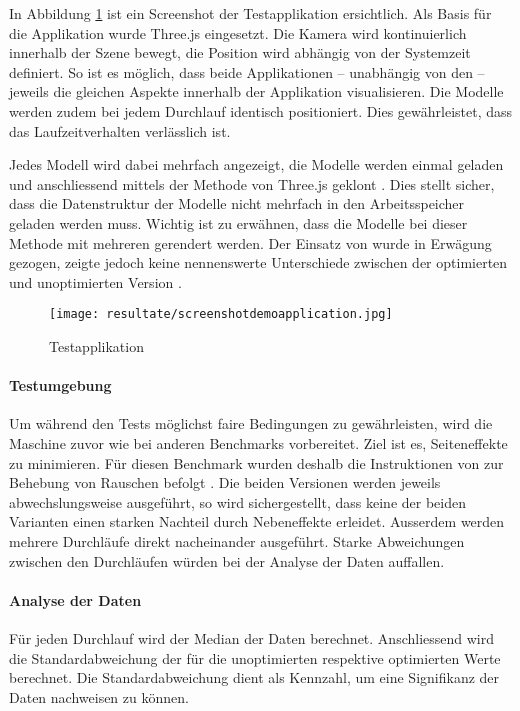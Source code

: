 In Abbildung \ref{fig:demoApplication} ist ein Screenshot der Testapplikation ersichtlich. Als Basis für die Applikation wurde Three.js eingesetzt. Die Kamera wird kontinuierlich innerhalb der Szene bewegt, die Position wird abhängig von der Systemzeit definiert. So ist es möglich, dass beide Applikationen – unabhängig von den  – jeweils die gleichen Aspekte innerhalb der Applikation visualisieren. Die Modelle werden zudem bei jedem Durchlauf identisch positioniert. Dies gewährleistet, dass das Laufzeitverhalten verlässlich ist.

Jedes Modell wird dabei mehrfach angezeigt, die Modelle werden einmal geladen und anschliessend mittels der  Methode von Three.js geklont \cite{threeObject3DClone}. Dies stellt sicher, dass die Datenstruktur der Modelle nicht mehrfach in den Arbeitsspeicher geladen werden muss. Wichtig ist zu erwähnen, dass die Modelle bei dieser Methode mit mehreren  gerendert werden. Der Einsatz von  wurde in Erwägung gezogen, zeigte jedoch keine nennenswerte Unterschiede zwischen der optimierten und unoptimierten Version \cite{threeInstancedMesh}.

\begin{figure}[H]
  \centering
  \texttt{[image: resultate/screenshotdemoapplication.jpg]}
  \caption{Testapplikation}
  \label{fig:demoApplication}
\end{figure}

\paragraph{Testumgebung}
Um während den Tests möglichst faire Bedingungen zu gewährleisten, wird die Maschine zuvor wie bei anderen Benchmarks vorbereitet. Ziel ist es, Seiteneffekte zu minimieren. Für diesen Benchmark wurden deshalb die Instruktionen von  zur Behebung von Rauschen befolgt \cite{tracerBenchNoiseMitigation}. Die beiden Versionen werden jeweils abwechslungsweise ausgeführt, so wird sichergestellt, dass keine der beiden Varianten einen starken Nachteil durch Nebeneffekte erleidet. Ausserdem werden mehrere Durchläufe direkt nacheinander ausgeführt. Starke Abweichungen zwischen den Durchläufen würden bei der Analyse der Daten auffallen.

\paragraph{Analyse der Daten}
Für jeden Durchlauf wird der Median der  Daten berechnet.
Anschliessend wird die Standardabweichung der  für die unoptimierten respektive optimierten Werte berechnet. Die Standardabweichung dient als Kennzahl, um eine Signifikanz der Daten nachweisen zu können.


